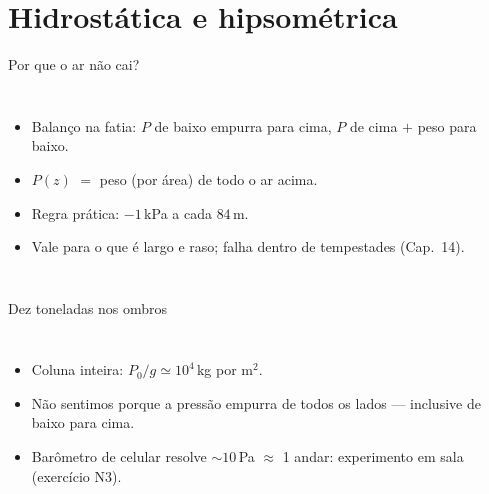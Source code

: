 \documentclass[aspectratio=169,11pt]{beamer}
\begin{document}
\section{Hidrostática e hipsométrica}

\begin{frame}{Por que o ar não cai?}
  \begin{columns}
    \vspace{0.4em}
    \begin{itemize}
      \item Balanço na fatia: $P$ de baixo empurra para cima, $P$ de cima
            $+$ peso para baixo.
      \item $P(z)$ $=$ peso (por área) de todo o ar acima.
      \item Regra prática: $-1$\,kPa a cada $84$\,m.
      \item Vale para o que é largo e raso; falha dentro de tempestades
            (Cap.~14).
    \end{itemize}
  \end{columns}
\end{frame}

\begin{frame}{Dez toneladas nos ombros}
  \begin{columns}
    \begin{itemize}
      \item Coluna inteira: $P_0/g \simeq 10^4$\,kg por m$^2$.
      \item Não sentimos porque a pressão empurra \alert{de todos os
            lados} — inclusive de baixo para cima.
      \item Barômetro de celular resolve $\sim10$\,Pa $\approx$ 1 andar:
            experimento em sala (exercício N3).
    \end{itemize}
  \end{columns}
\end{frame}
\end{document}
